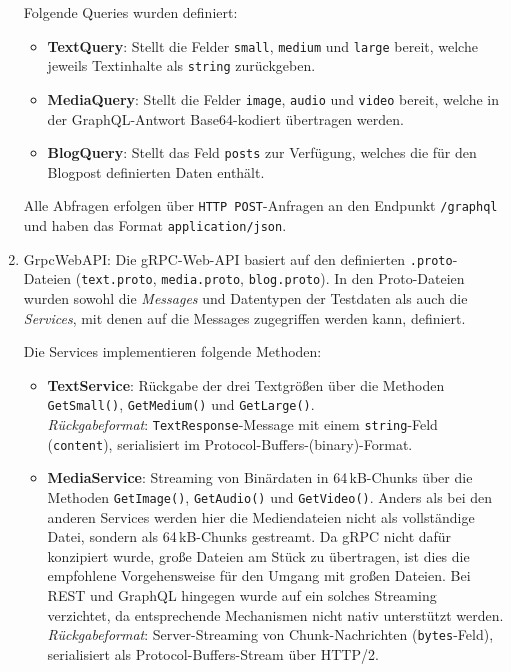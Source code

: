 \begin{enumerate}
	Folgende Queries wurden definiert:
	\begin{itemize}
		\item \textbf{TextQuery}: Stellt die Felder \texttt{small}, \texttt{medium} und \texttt{large} bereit, welche jeweils Textinhalte als \texttt{string} zurückgeben.
		\item \textbf{MediaQuery}: Stellt die Felder \texttt{image}, \texttt{audio} und \texttt{video} bereit, welche in der GraphQL-Antwort Base64-kodiert übertragen werden.
		\item \textbf{BlogQuery}: Stellt das Feld \texttt{posts} zur Verfügung, welches die für den Blogpost definierten Daten enthält.
	\end{itemize}
	
	Alle Abfragen erfolgen über \texttt{HTTP~POST}-Anfragen an den Endpunkt \texttt{/graphql} und haben das Format \texttt{application/json}.
	
	\item GrpcWebAPI: 
	Die gRPC-Web-API basiert auf den definierten \texttt{.proto}-Dateien (\texttt{text.proto}, \texttt{media.proto}, \texttt{blog.proto}). In den Proto-Dateien wurden sowohl die \emph{Messages} und Datentypen der Testdaten als auch die \emph{Services}, mit denen auf die Messages zugegriffen werden kann, definiert. 
	
	Die Services implementieren folgende Methoden:
	\begin{itemize}
		\item \textbf{TextService}: Rückgabe der drei Textgrößen über die Methoden \texttt{GetSmall()}, \texttt{GetMedium()} und \texttt{GetLarge()}.\\
		\emph{Rückgabeformat}: \texttt{TextResponse}-Message mit einem \texttt{string}-Feld (\texttt{content}), serialisiert im Protocol-Buffers-(binary)-Format.
		
		\item \textbf{MediaService}: Streaming von Binärdaten in 64\,kB-Chunks über die Methoden \texttt{GetImage()}, \texttt{GetAudio()} und \texttt{GetVideo()}. Anders als bei den anderen Services werden hier die Mediendateien nicht als vollständige Datei, sondern als 64\,kB-Chunks gestreamt. Da gRPC nicht dafür konzipiert wurde, große Dateien am Stück zu übertragen, ist dies die empfohlene Vorgehensweise für den Umgang mit großen Dateien. Bei REST und GraphQL hingegen wurde auf ein solches Streaming verzichtet, da entsprechende Mechanismen nicht nativ unterstützt werden.\\
		\emph{Rückgabeformat}: Server-Streaming von Chunk-Nachrichten (\texttt{bytes}-Feld), serialisiert als Protocol-Buffers-Stream über HTTP/2.
		

\end{itemize}
\end{enumerate}

